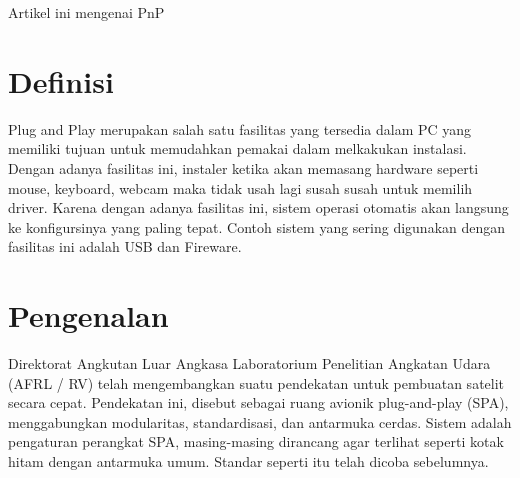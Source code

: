 
Artikel ini mengenai PnP

\section{Definisi}
Plug and Play merupakan salah satu fasilitas yang tersedia dalam PC yang memiliki tujuan untuk memudahkan pemakai dalam melkakukan instalasi. Dengan adanya fasilitas ini, instaler ketika akan memasang hardware seperti mouse, keyboard, webcam maka tidak usah lagi susah susah untuk memilih driver. Karena dengan adanya fasilitas ini, sistem operasi otomatis akan langsung ke konfigursinya yang paling tepat. Contoh sistem yang sering digunakan dengan fasilitas ini adalah USB dan Fireware. 
\section{Pengenalan}
Direktorat Angkutan Luar Angkasa Laboratorium Penelitian Angkatan Udara (AFRL / RV) telah mengembangkan suatu pendekatan untuk pembuatan satelit secara cepat. Pendekatan ini, disebut sebagai ruang avionik plug-and-play (SPA), menggabungkan modularitas, standardisasi, dan antarmuka cerdas. Sistem adalah pengaturan perangkat SPA, masing-masing dirancang agar terlihat seperti kotak hitam dengan antarmuka umum. Standar seperti itu telah dicoba sebelumnya.